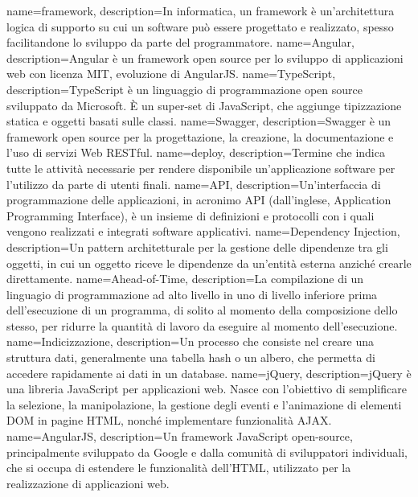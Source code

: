 {
    name=framework,
    description={In informatica, un framework è un'architettura logica di supporto su cui un software può essere progettato e realizzato, spesso facilitandone lo sviluppo da parte del programmatore.}
}
{
    name=Angular,
    description={Angular è un framework open source per lo sviluppo di applicazioni web con licenza MIT, evoluzione di AngularJS.}
}
{
    name=TypeScript,
    description={TypeScript è un linguaggio di programmazione open source sviluppato da Microsoft. È un super-set di JavaScript, che aggiunge tipizzazione statica e oggetti basati sulle classi.}
}
{
    name=Swagger,
    description={Swagger è un framework open source per la progettazione, la creazione, la documentazione e l'uso di servizi Web RESTful.}
}
{
    name=deploy,
    description={Termine che indica tutte le attività necessarie per rendere disponibile un'applicazione software per l'utilizzo da parte di utenti finali.}
}
{
    name=API,
    description={Un'interfaccia di programmazione delle applicazioni, in acronimo API (dall'inglese, Application Programming Interface), è un insieme di definizioni e protocolli con i quali vengono realizzati e integrati software applicativi.}
}
{
    name=Dependency Injection,
    description={Un pattern architetturale per la gestione delle dipendenze tra gli oggetti, in cui un oggetto riceve le dipendenze da un'entità esterna anziché crearle direttamente.}
}
{
    name=Ahead-of-Time,
    description={La compilazione di un linguagio di programmazione ad alto livello in uno di livello inferiore prima dell'esecuzione di un programma, di solito al momento della composizione dello stesso, per ridurre la quantità di lavoro da eseguire al momento dell'esecuzione.}
}
{
    name=Indicizzazione,
    description={Un processo che consiste nel creare una struttura dati, generalmente una tabella hash o un albero, che permetta di accedere rapidamente ai dati in un database.}
}
{
    name=jQuery,
    description={jQuery è una libreria JavaScript per applicazioni web. Nasce con l'obiettivo di semplificare la selezione, la manipolazione, la gestione degli eventi e l'animazione di elementi DOM in pagine HTML, nonché implementare funzionalità AJAX.}
}
{
    name=AngularJS,
    description={Un framework JavaScript open-source, principalmente sviluppato da Google e dalla comunità di sviluppatori individuali, che si occupa di estendere le funzionalità dell'HTML, utilizzato per la realizzazione di applicazioni web.}
}
